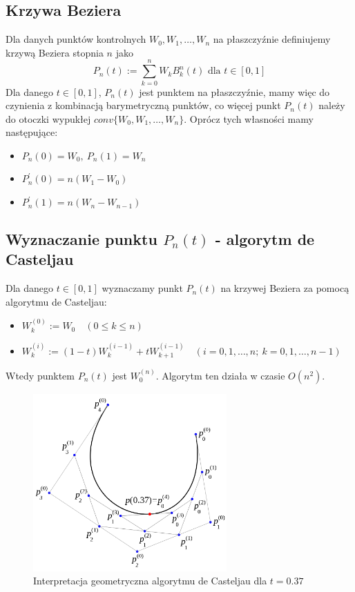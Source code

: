 \documentclass[a4paper,11pt]{article}
\begin{document}
\subsection{Krzywa Beziera}
Dla danych punktów kontrolnych $W_0, W_1, \ldots, W_n$ na płaszczyźnie definiujemy krzywą Beziera stopnia $n$ jako
$$ P_n(t) := \sum\limits_{k=0}^{n}W_kB_k^n(t) \text{ dla } t\in[0,1]$$
\noindent Dla danego $t\in[0,1]$, $P_n(t)$ jest punktem na płaszczyźnie, mamy więc do czynienia z kombinacją barymetryczną punktów, co więcej punkt $P_n(t)$ należy do otoczki wypukłej $conv\{W_0, W_1, \ldots, W_n\}$. Oprócz tych własności mamy następujące:
\begin{itemize}
\item $P_n(0) = W_0, \ P_n(1)=W_n$
\item $P_n^{'}(0) = n(W_1-W_0)$
\item $P_n^{'}(1) = n(W_n-W_{n-1})$ 
\end{itemize}

\subsection{Wyznaczanie punktu $P_n(t)$ - algorytm de Casteljau}
Dla danego $t\in[0,1]$ wyznaczamy punkt $P_n(t)$ na krzywej Beziera za pomocą algorytmu de Casteljau:
\begin{itemize}
\item $W_k^{(0)} := W_0 \quad (0\leq k \leq n)$
\item $W_k^{(i)} := (1-t)W_k^{(i-1)}+tW_{k+1}^{(i-1)}\quad (i=0, 1, \ldots, n; \ k= 0, 1, \ldots, n-1)$
\end{itemize}
Wtedy punktem $P_n(t)$ jest $W_0^{(n)}$. Algorytm ten działa w czasie $O(n^2)$.

\begin{figure}[H]
\centering
\includegraphics[width=0.66\textwidth]{decasteljau.png}
\caption{Interpretacja geometryczna algorytmu de Casteljau dla $t=0.37$}
\label{decasteljau}
\end{figure}
\end{document}
